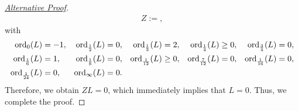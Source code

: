 \documentclass[12pt]{article}
\numberwithin{equation}{section}
\theoremstyle{plain}
\numberwithin{theorem}{section}
\theoremstyle{definition}
\theoremstyle{remark}
\begin{document}
\begin{proof}[\underline{Alternative Proof}]
\begin{align*}
        Z:=,
    \end{align*}
    with
    \begin{align*}
        \textup{ord}_0(L)&= -1, & \textup{ord}_\frac{1}{2}(L)&= 0, & \textup{ord}_\frac{1}{3}(L)&= 2, & \textup{ord}_\frac{1}{4}(L)&\ge 0, & \textup{ord}_\frac{3}{4}(L)&= 0, \\ \textup{ord}_\frac{1}{6}(L)&= 1, &
        \textup{ord}_\frac{1}{8}(L)&= 0, & \textup{ord}_\frac{1}{12}(L)&\ge 0, & \textup{ord}_\frac{7}{12}(L)&= 0, & \textup{ord}_\frac{1}{16}(L)&= 0, \\ \textup{ord}_\frac{1}{24}(L)&= 0, & \textup{ord}_\infty(L)&= 0.
    \end{align*}
    Therefore, we obtain $ZL=0$, which immediately implies that $L=0$. Thus, we complete the proof.
\end{proof}
\fi
    
\end{document}
